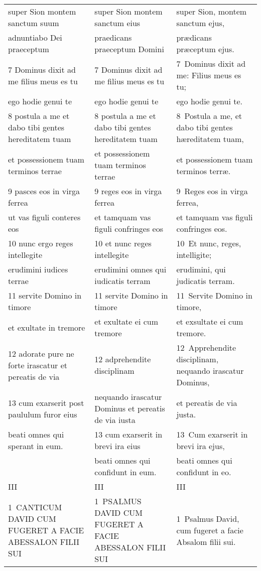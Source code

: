 \documentclass{article}
\begin{document}
\begin{longtable}{@{}p{}p{}p{}@{}}
super Sion montem sanctum suum	&	super Sion montem sanctum eius	&	super Sion, montem sanctum ejus,	\\
adnuntiabo Dei praeceptum	&	praedicans praeceptum Domini	&	prædicans præceptum ejus.	\\
7 Dominus dixit ad me filius meus es tu	&	7 Dominus dixit ad me filius meus es tu	&	7 Dominus dixit ad me: Filius meus es tu;	\\
ego hodie genui te	&	ego hodie genui te	&	ego hodie genui te.	\\
8 postula a me et dabo tibi gentes hereditatem tuam	&	8 postula a me et dabo tibi gentes hereditatem tuam	&	8 Postula a me, et dabo tibi gentes hæreditatem tuam,	\\
et possessionem tuam terminos terrae	&	et possessionem tuam terminos terrae	&	et possessionem tuam terminos terræ.	\\
9 pasces eos in virga ferrea	&	9 reges eos in virga ferrea	&	9 Reges eos in virga ferrea,	\\
ut vas figuli conteres eos	&	et tamquam vas figuli confringes eos	&	et tamquam vas figuli confringes eos.	\\
10 nunc ergo reges intellegite	&	10 et nunc reges intellegite	&	10 Et nunc, reges, intelligite;	\\
erudimini iudices terrae	&	erudimini omnes qui iudicatis terram	&	erudimini, qui judicatis terram.	\\
11 servite Domino in timore	&	11 servite Domino in timore	&	11 Servite Domino in timore,	\\
et exultate in tremore	&	et exultate ei cum tremore	&	et exsultate ei cum tremore.	\\
12 adorate pure ne forte irascatur et pereatis de via	&	12 adprehendite disciplinam	&	12 Apprehendite disciplinam, nequando irascatur Dominus,	\\
13 cum exarserit post paululum furor eius	&	nequando irascatur Dominus et pereatis de via iusta	&	et pereatis de via justa.	\\
beati omnes qui sperant in eum.	&	13 cum exarserit in brevi ira eius	&	13 Cum exarserit in brevi ira ejus,	\\
	&	beati omnes qui confidunt in eum.	&	beati omnes qui confidunt in eo.	\\
III	&	III	&	III	\\
1 CANTICUM DAVID CUM FUGERET A FACIE ABESSALON FILII SUI	&	1 PSALMUS DAVID CUM FUGERET A FACIE ABESSALON FILII SUI	&	1 Psalmus David, cum fugeret a facie Absalom filii sui.	\\

\end{longtable}
\end{document}
